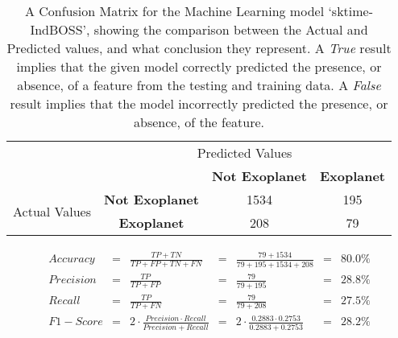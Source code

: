 
    \renewcommand{\arraystretch}{2}
    \renewcommand{\tabcolsep}{20.25pt}
    \vspace{-0.5cm}
    \begin{table}[ht]
    \begin{tabular}{cccc}
     & \multicolumn{3}{c}{Predicted Values} \\ \cline{3-4}
     & \multicolumn{1}{c|}{} & \multicolumn{1}{c|}{\textbf{Not Exoplanet}} & \multicolumn{1}{c|}{\textbf{Exoplanet}} \\ \cline{2-4}
    \multicolumn{1}{c|}{\multirow{2}{2.0cm}{Actual Values}} & \multicolumn{1}{c|}{\textbf{Not Exoplanet}} & \multicolumn{1}{c|}{1534} & \multicolumn{1}{c|}{195} \\ \cline{2-4}
    \multicolumn{1}{c|}{} & \multicolumn{1}{c|}{\textbf{Exoplanet}} & \multicolumn{1}{c|}{208} & \multicolumn{1}{c|}{79} \\ \cline{2-4}
    \end{tabular}
    \caption{A Confusion Matrix for the Machine Learning model `sktime-IndBOSS', showing the comparison between the Actual and Predicted values, and what conclusion they represent. A \emph{True} result implies that the given model correctly predicted the presence, or absence, of a feature from the testing and training data. A \emph{False} result implies that the model incorrectly predicted the presence, or absence, of the feature.}
    \label{tab:sktime-IndBOSSconfusionmatrix}
    \end{table}
    \vspace{-0.75cm}
    \label{eq:metrics-sktime-IndBOSS}
    \begin{align*}
        Accuracy &= &\frac{TP + TN}{TP + FP + TN + FN} &= &\frac{79 + 1534}{79 + 195 + 1534 + 208} &= & 80.0\% \\
        Precision &= &\frac{TP}{TP + FP} &= &\frac{79}{79 + 195} &= & 28.8\% \\
        Recall &= &\frac{TP}{TP + FN} &= &\frac{79}{79 + 208} &= & 27.5\% \\
        F1-Score &= &2 \cdot \frac{Precision \cdot Recall}{Precision + Recall} &= &2 \cdot \frac{0.2883 \cdot 0.2753}{0.2883 + 0.2753} &= & 28.2\% \\
    \end{align*}
    \vspace{-1.75cm}
    \renewcommand{\arraystretch}{1}
    \renewcommand{\tabcolsep}{5.25pt}
    